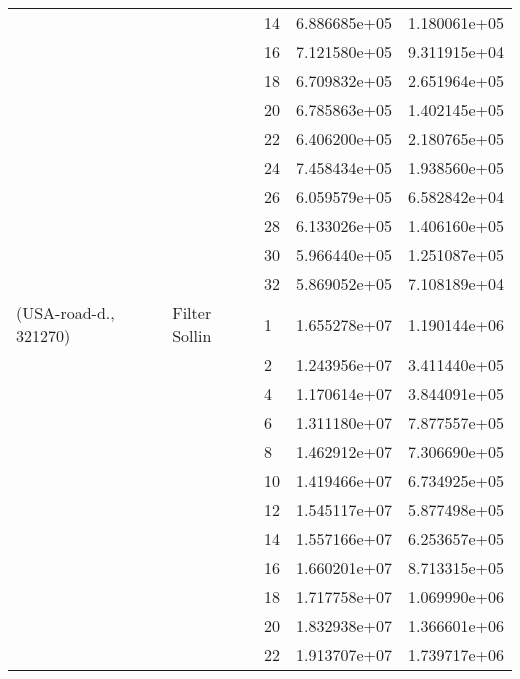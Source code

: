 \begin{tabular}{lllrr}
                      &                     & 14 &  6.886685e+05 &  1.180061e+05 \\
                      &                     & 16 &  7.121580e+05 &  9.311915e+04 \\
                      &                     & 18 &  6.709832e+05 &  2.651964e+05 \\
                      &                     & 20 &  6.785863e+05 &  1.402145e+05 \\
                      &                     & 22 &  6.406200e+05 &  2.180765e+05 \\
                      &                     & 24 &  7.458434e+05 &  1.938560e+05 \\
                      &                     & 26 &  6.059579e+05 &  6.582842e+04 \\
                      &                     & 28 &  6.133026e+05 &  1.406160e+05 \\
                      &                     & 30 &  5.966440e+05 &  1.251087e+05 \\
                      &                     & 32 &  5.869052e+05 &  7.108189e+04 \\
(USA-road-d., 321270) & Filter Sollin & 1  &  1.655278e+07 &  1.190144e+06 \\
                      &                     & 2  &  1.243956e+07 &  3.411440e+05 \\
                      &                     & 4  &  1.170614e+07 &  3.844091e+05 \\
                      &                     & 6  &  1.311180e+07 &  7.877557e+05 \\
                      &                     & 8  &  1.462912e+07 &  7.306690e+05 \\
                      &                     & 10 &  1.419466e+07 &  6.734925e+05 \\
                      &                     & 12 &  1.545117e+07 &  5.877498e+05 \\
                      &                     & 14 &  1.557166e+07 &  6.253657e+05 \\
                      &                     & 16 &  1.660201e+07 &  8.713315e+05 \\
                      &                     & 18 &  1.717758e+07 &  1.069990e+06 \\
                      &                     & 20 &  1.832938e+07 &  1.366601e+06 \\
                      &                     & 22 &  1.913707e+07 &  1.739717e+06 \\

\end{tabular}
